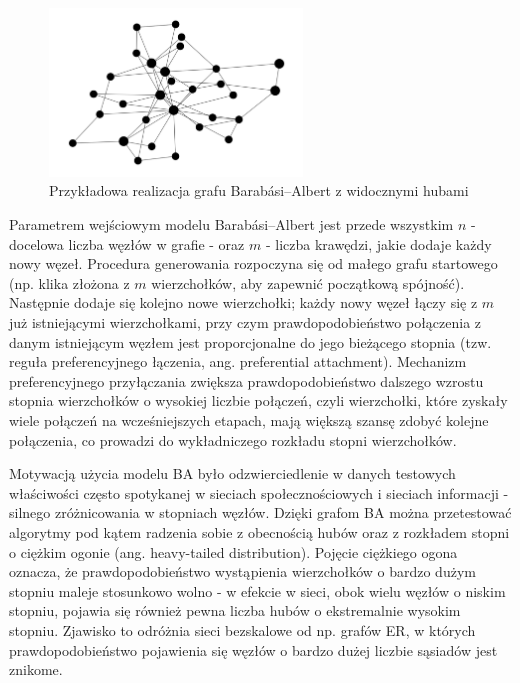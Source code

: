 \begin{figure}[h]
    \centering
    \includegraphics[width=0.6\textwidth]{assets/test_data/scalefree.png}
    \caption{Przykładowa realizacja grafu Barabási--Albert z widocznymi hubami}
    \label{fig:BA}
\end{figure}

Parametrem wejściowym modelu Barabási--Albert jest przede wszystkim $n$ - docelowa liczba węzłów w grafie - oraz $m$ - liczba krawędzi, jakie dodaje każdy nowy węzeł. Procedura generowania rozpoczyna się od małego grafu startowego (np. klika złożona z $m$ wierzchołków, aby zapewnić początkową spójność). Następnie dodaje się kolejno nowe wierzchołki; każdy nowy węzeł łączy się z $m$ już istniejącymi wierzchołkami, przy czym prawdopodobieństwo połączenia z danym istniejącym węzłem jest proporcjonalne do jego bieżącego stopnia (tzw. reguła preferencyjnego łączenia, ang. preferential attachment). Mechanizm preferencyjnego przyłączania zwiększa prawdopodobieństwo dalszego wzrostu stopnia wierzchołków o wysokiej liczbie połączeń, czyli wierzchołki, które zyskały wiele połączeń na wcześniejszych etapach, mają większą szansę zdobyć kolejne połączenia, co prowadzi do wykładniczego rozkładu stopni wierzchołków.

Motywacją użycia modelu BA było odzwierciedlenie w danych testowych właściwości często spotykanej w sieciach społecznościowych i sieciach informacji - silnego zróżnicowania w stopniach węzłów. Dzięki grafom BA można przetestować algorytmy pod kątem radzenia sobie z obecnością hubów oraz z rozkładem stopni o ciężkim ogonie (ang. heavy-tailed distribution). Pojęcie ciężkiego ogona oznacza, że prawdopodobieństwo wystąpienia wierzchołków o bardzo dużym stopniu maleje stosunkowo wolno - w efekcie w sieci, obok wielu węzłów o niskim stopniu, pojawia się również pewna liczba hubów o ekstremalnie wysokim stopniu. Zjawisko to odróżnia sieci bezskalowe od np. grafów ER, w których prawdopodobieństwo pojawienia się węzłów o bardzo dużej liczbie sąsiadów jest znikome.


